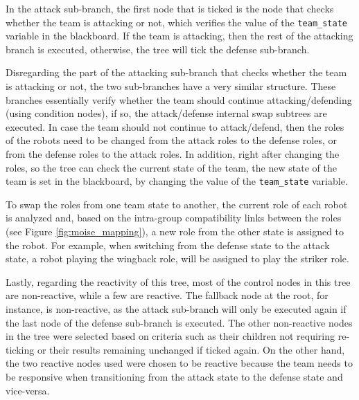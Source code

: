In the attack sub-branch, the first node that is ticked is the node that checks whether the team is attacking or not, which verifies the value of the \texttt{team\_state} variable in the blackboard. If the team is attacking, then the rest of the attacking branch is executed, otherwise, the tree will tick the defense sub-branch.

Disregarding the part of the attacking sub-branch that checks whether the team is attacking or not, the two sub-branches have a very similar structure. These branches essentially verify whether the team should continue attacking/defending (using condition nodes), if so, the attack/defense internal swap subtrees are executed. In case the team should not continue to attack/defend, then the roles of the robots need to be changed from the attack roles to the defense roles, or from the defense roles to the attack roles. In addition, right after changing the roles, so the tree can check the current state of the team, the new state of the team is set in the blackboard, by changing the value of the \texttt{team\_state} variable.

To swap the roles from one team state to another, the current role of each robot is analyzed and, based on the intra-group compatibility links between the roles (see Figure \ref{fig:moise_mapping}), a new role from the other state is assigned to the robot. For example, when switching from the defense state to the attack state, a robot playing the wingback role, will be assigned to play the striker role.

Lastly,  regarding the reactivity of this tree, most of the control nodes in this tree are non-reactive, while a few are reactive. The fallback node at the root, for instance, is non-reactive, as the attack sub-branch will only be executed again if the last node of the defense sub-branch is executed. The other non-reactive nodes in the tree were selected based on criteria such as their children not requiring re-ticking or their results remaining unchanged if ticked again. On the other hand, the two reactive nodes used were chosen to be reactive because the team needs to be responsive when transitioning from the attack state to the defense state and vice-versa.

